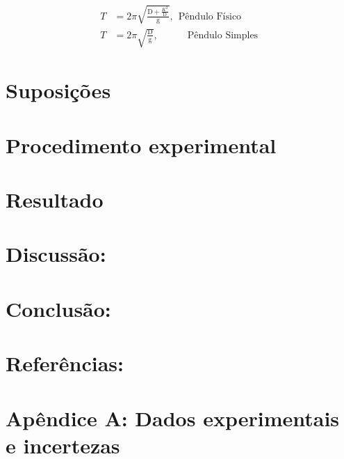 \documentclass[a4paper]{report}
\begin{document}
\begin{align}
        T &= 2\pi \sqrt{\frac{\text{D} + \frac{\text{$K^2$}}{\text{D}}}{\text{g}}}, \ \ \text{Pêndulo Físico }\\
        T &= 2\pi \sqrt{\frac{\text{D}}{\text{g}}},\quad \qquad \text{Pêndulo Simples }
\end{align}



\section*{Suposições}
\pagebreak
\section*{Procedimento experimental}
\section*{Resultado}
\section*{Discussão:}
\section*{Conclusão:}
\section*{Referências:}
\section*{Apêndice A: Dados experimentais e incertezas}
\end{document}
